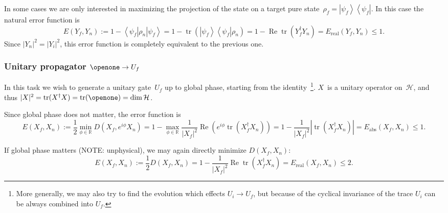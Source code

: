 \documentclass[aps, pra, a4paper, longbibliography]{revtex4}
\newcommand{\I}{\openone}
\newcommand{\be}{\begin{equation}}
\newcommand{\ee}{\end{equation}}
\newcommand{\R}{{\mathbb R}}  %
\newcommand{\ket}[1]{\left| #1 \right \rangle}
\newcommand{\bra}[1]{\left \langle #1 \right|}
\newcommand{\ketbra}[2]{\left| #1 \right \rangle \left \langle #2 \right|}
\newcommand{\hilb}[1]{\mathcal{#1}}
\DeclareMathOperator{\tr}{tr}
\DeclareMathOperator{\re}{Re}
\begin{document}
In some cases we are only interested in maximizing the projection of
the state on a target pure state~$\rho_f = \ketbra{\psi_f}{\psi_f}$. In this case the natural error
function is
\be
E(Y_f, Y_n)
:= 1 -\bra{\psi_f} \rho_n \ket{\psi_f}
= 1 -\tr\left(\ketbra{\psi_f}{\psi_f} \rho_n \right)
= 1 -\re \tr\left(Y_f^\dagger Y_n\right)
= E_\text{real}(Y_f, Y_n) \le 1.
\ee
Since $|Y_n|^2 = |Y_i|^2$, this error function is completely equivalent to the previous one.


\subsubsection{Unitary propagator $\I \to U_f$}
\label{sec:closed-u}
In this task we wish to generate a unitary gate~$U_f$ up to global
phase, starting from the identity~\footnote{More generally, we may also try to find the evolution which effects
$U_i \to U_f$, but because of the cyclical invariance of the trace $U_i$ can be always combined into $U_f$.}.
$X$~is a unitary operator on~$\hilb{H}$, and
thus $|X|^2 = \tr(X^\dagger X) = \tr(\I) = \dim \hilb{H}$.

Since global phase does not matter, the error function is
\be
E(X_f, X_n)
:= \frac{1}{2} \min_{\phi \in \R} D(X_f, e^{i \phi} X_n)
= 1 -\max_{\phi \in \R} \frac{1}{|X_f|^2} \re \left( e^{i \phi} \tr(X_f^\dagger X_n)\right)
= 1 -\frac{1}{|X_f|^2}|\tr(X_f^\dagger X_n)|
= E_\text{abs}(X_f, X_n) \le 1.
\ee
\begin{comment}
We can also get rid of phase by explicitly lifting the problem into
Liouville space (see Eq.~\eqref{eq:L-unitary}),
$X = \hat{V} = V^* \otimes V$,
and then minimize the operator distance~$D(X_f, X_n)$.

Using Eq.~\eqref{eq:hat-product}, the norm squared is 
\be
|X|^2 = |\hat{V}|^2
= \tr(\hat{V}^\dagger \hat{V})
= |\tr(V^\dagger V)|^2
= |\tr(\I)|^2
= N^2.
\ee
This is constant, so (X1) holds and we may maximize the fidelity instead:
\be
f(X_f, X_n)
= \frac{1}{N^2} \re \tr \left(X_f^\dagger X_n \right)
= \frac{1}{N^2} (\re) \left| \tr \left(V_f^\dagger V_n \right) \right|^2.
\ee
It clearly obeys $0 \le f(X_f, X_n) \le 1$.
Much like in
Sec.~\ref{sec:closed-pure},
the problem simplifies back into Hilbert space, and we may equivalently
choose~$X = V$.
\end{comment}


If global phase matters (NOTE: unphysical), we may again directly minimize
$D(X_f, X_n)$:
\be
E(X_f, X_n)
:= \frac{1}{2} D(X_f, X_n)
= 1 -\frac{1}{|X_f|^2} \re \tr(X_f^\dagger X_n)
= E_\text{real}(X_f, X_n) \le 2.
\ee
\end{document}
